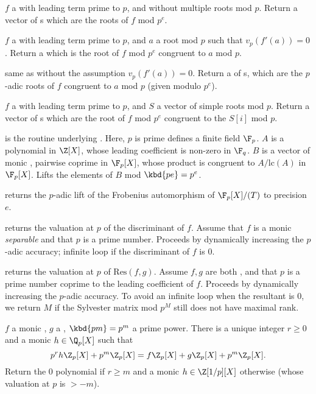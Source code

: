  $f$ a  with leading
term prime to $p$, and without multiple roots mod $p$. Return a vector
of s which are the roots of $f$ mod $p^e$.

 $f$ a  with
leading term prime to $p$, and $a$ a root mod $p$ such that
$v_p(f'(a))=0$.  Return a  which is the root of $f$ mod $p^e$
congruent to $a$ mod $p$.

 same as 
without the assumption $v_p(f'(a)) = 0$. Return a  of s,
which are the $p$-adic roots of $f$ congruent to $a$ mod $p$ (given modulo
$p^e$).

 $f$ a  with
leading term prime to $p$, and $S$ a vector of simple roots mod $p$. Return a
vector of s which are the root of $f$ mod $p^e$ congruent to the
$S[i]$ mod $p$.

 is
the routine underlying . Here, $p$ is prime
defines a finite field $\F_p$. $A$ is a polynomial in
$\Z[X]$, whose leading coefficient is non-zero in $\F_q$. $B$ is a vector of
monic , pairwise coprime in $\F_p[X]$, whose product is congruent to
$A/\text{lc}(A)$ in $\F_p[X]$. Lifts the elements of $B$ mod $\kbd{pe} = p^e$.

 returns the $p$-adic lift
of the Frobenius automorphism of $\F_p[X]/(T)$ to precision $e$.

 returns the valuation at $p$ of the
discriminant of $f$. Assume that $f$ is a monic \emph{separable} 
and that $p$ is a prime number. Proceeds by dynamically increasing the
$p$-adic accuracy; infinite loop if the discriminant of $f$ is
$0$.

 returns the
valuation at $p$ of $\text{Res}(f,g)$. Assume $f,g$ are both ,
and that $p$ is a prime number coprime to the leading coefficient of $f$.
Proceeds by dynamically increasing the $p$-adic accuracy.
To avoid an infinite loop when the resultant is $0$, we return $M$ if
the Sylvester matrix mod $p^M$ still does not have maximal rank.

 $f$ a monic ,
$g$ a , $\kbd{pm} = p^m$ a prime power. There is a unique integer
$r\geq 0$ and a monic $h\in \Q_p[X]$ such that
$$p^rh\Z_p[X] + p^m\Z_p[X] = f\Z_p[X] + g\Z_p[X] + p^m\Z_p[X].$$
Return the $0$ polynomial if $r\geq m$ and a monic $h\in\Z[1/p][X]$ otherwise
(whose valuation at $p$ is $> -m$).

